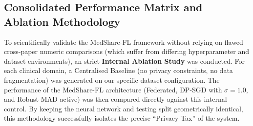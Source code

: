 \documentclass[10pt, a4paper, twocolumn]{article}
\begin{document}
\subsection{Consolidated Performance Matrix and Ablation Methodology}

To scientifically validate the MedShare-FL framework without relying on flawed cross-paper numeric comparisons (which suffer from differing hyperparameter and dataset environments), an strict \textbf{Internal Ablation Study} was conducted. For each clinical domain, a Centralised Baseline (no privacy constraints, no data fragmentation) was generated on our specific dataset configuration. The performance of the MedShare-FL architecture (Federated, DP-SGD with $\sigma=1.0$, and Robust-MAD active) was then compared directly against this internal control. By keeping the neural network and testing split geometrically identical, this methodology successfully isolates the precise ``Privacy Tax'' of the system.

\begin{table}[hbt!]
\centering
\footnotesize
{}
\caption{Table 6: Verified Technical Performance Matrix across all 7 Clinical Domains. The resulting diagnostic accuracy curves are consolidated in Figure 3.}
\end{table}
\end{document}
